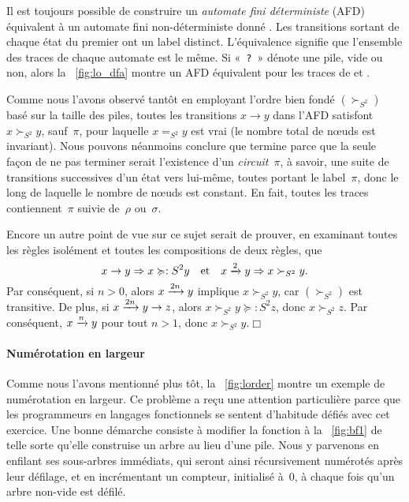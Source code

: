 Il est toujours possible de construire un \emph{automate fini
  déterministe} (AFD) équivalent à un automate fini non-déterministe
donné \citep{VanLeeuwen_1990c,HopcroftMotwaniUllman_2003}. Les
transitions sortant de chaque état du premier ont un label
distinct. L'équivalence signifie que l'ensemble des traces de chaque
automate est le même. Si «~\texttt{?}~» dénote une pile, vide ou non,
alors la \fig~\vref{fig:lo_dfa} montre un AFD équivalent pour les
traces de  et
.

Comme nous l'avons observé tantôt en employant l'ordre bien fondé
\((\succ_{S^2})\) basé sur la taille des piles, toutes les transitions
\(x \rightarrow y\) dans l'AFD satisfont \(x \succ_{S^2} y\),
sauf~\(\pi\), pour laquelle \(x =_{S^2} y\) est vrai (le nombre total
de nœuds est invariant). Nous pouvons néanmoins conclure que
 termine parce que la seule façon de ne pas terminer serait
l'existence d'un \emph{circuit}~\(\pi\), à savoir, une suite de
transitions successives d'un état vers lui-même, toutes portant le
label~\(\pi\), donc le long de laquelle le nombre de nœuds est
constant. En fait, toutes les traces contiennent~\(\pi\) suivie
de~\(\rho\) ou~\(\sigma\).

Encore un autre point de vue sur ce sujet serait de prouver, en
examinant toutes les règles isolément et toutes les compositions de
deux règles, que
\begin{equation*}
x \rightarrow y \Rightarrow x \succcurlyeq:{S^2} y
\quad \text{et} \quad
x \xrightarrow{\smash{2}} y \Rightarrow x \succ_{S^2} y.
\end{equation*}
Par conséquent, si \(n > 0\), alors \(x \xrightarrow{\smash{2n}} y\)
implique \(x \succ_{S^2} y\), car \((\succ_{S^2})\) est transitive. De
plus, si \(x \xrightarrow{\smash{2n}} y \rightarrow z\), alors \(x
\succ_{S^2} y \succcurlyeq:{S^2} z\), donc \(x \succ_{S^2} z\). Par
conséquent, \(x \xrightarrow{\smash{n}} y\) pour tout \(n > 1\), donc
\(x \succ_{S^2} y\).\hfill\(\Box\)

\paragraph{Numérotation en largeur}

Comme nous l'avons mentionné plus tôt, la \fig~\vref{fig:lorder}
montre un exemple de numérotation en largeur. Ce problème a reçu une
attention particulière
\citep{JonesGibbons_1993,GibbonsJones_1998,Okasaki_2000} parce que les
programmeurs en langages fonctionnels se sentent d'habitude défiés
avec cet exercice. Une bonne démarche consiste à modifier la fonction
 à la \fig~\vref{fig:bf1}
de telle sorte qu'elle construise un arbre au lieu d'une pile. Nous y
parvenons en enfilant ses sous-arbres immédiats, qui seront ainsi
récursivement numérotés après leur défilage, et en incrémentant un
compteur, initialisé à~\(0\), à chaque fois qu'un arbre non-vide est
défilé.

